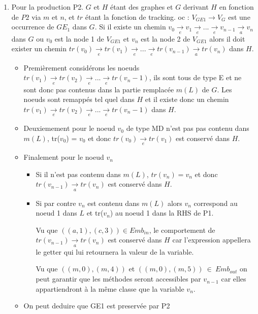 \documentclass[a4paper, 12pt]{article}
\begin{document}
\begin{enumerate}
    \item Pour la production P2. $G$ et $H$ étant des graphes et $G$ derivant $H$ en fonction de $P2$ via $m$ et $n$, et $tr$ étant la fonction de tracking.
    oc :  \( {V_{GE1}} {\rightarrow} {V_G} \) est une occurrence de $GE_1$ dans $G$.
    Si il existe un chemin \( {v_0} \underset{e}{\rightarrow} {v_1} \underset{e}{\rightarrow} ... \underset{e}{\rightarrow} v_{n-1} \underset{a}{\rightarrow} {v_n} \) dans $G$
    ou $v_0$ est la node 1 de $V_{GE1}$ et $v_n$ est la node 2 de $V_{GE1}$
    alors il doit exister un chemin \( tr(v_0) \underset{e}{\rightarrow} tr(v_1) \underset{e}{\rightarrow} ... \underset{e}{\rightarrow} tr(v_{n-1}) \underset{a}{\rightarrow} tr({v_n}) \) dans $H$.
    \begin{itemize}[label=\textbullet]
      \item Premièrement considérons les noeuds $tr(v_1) \underset{e}{\rightarrow} tr(v_2) \underset{e}{\rightarrow} ... \underset{e}{\rightarrow} tr(v_n-1)$,
      ils sont tous de type E et ne sont donc pas contenus dans la partie remplacée $m(L)$ de $G$.
      Les noeuds sont remappés tel quel dans $H$ et il existe donc un chemin $tr(v_1) \underset{e}{\rightarrow} tr(v_2) \underset{e}{\rightarrow} ... \underset{e}{\rightarrow} tr(v_n-1)$ dans $H$.

      \item Deuxiemement pour le noeud {$v_0$} de type MD n'est pas pas contenu dans $m(L)$, tr({$v_0$}) = {$v_0$} et donc $tr({v_0}) \underset{e}{\rightarrow} tr({v_1})$ est conservé dans $H$.

      \item  Finalement pour le noeud {$v_n$}
      \begin{itemize}
      \item Si il n'est pas contenu dans $m(L)$, $tr(v_n)= v_n$ et donc $tr(v_{n-1}) \underset{a}{\rightarrow} tr(v_n)$ est conservé dans $H$.
      \item Si par contre {$v_n$} est contenu dans $m(L)$ alors {$v_n$} correspond au noeud 1 dans $L$ et tr($v_n$) au noeud 1 dans la RHS de P1.

      Vu que $((a,1),(c,3)) \in Emb_{in}$, le comportement de $tr(v_{n-1}) \underset{a}{\rightarrow} tr(v_n)$ est conservé dans $H$ car l'expression appellera le getter qui lui retournera la valeur de la variable.

      Vu que $((m,0),(m,4))$ et $((m,0),(m,5))~\in~Emb_{out}$ on peut garantir que les méthodes seront accessibles par $v_{n-1}$ car elles appartiendront à la même classe que la variable $v_n$.
      \end{itemize}
      \item On peut deduire que GE1 est preservée par P2
    \end{itemize}

  \end{enumerate}
\end{document}
